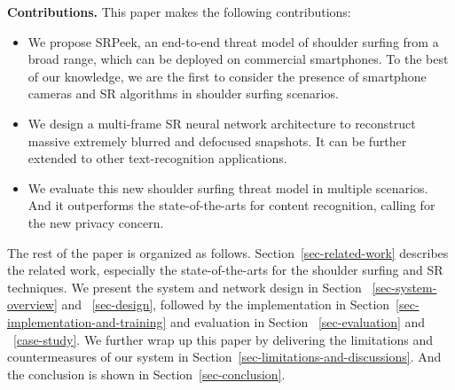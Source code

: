 \vspace{1mm}
\noindent
\textbf{Contributions.} This paper makes the following contributions:
\begin{itemize}[leftmargin=*]
  \item	We propose \textsf{SRPeek}, an end-to-end threat model of shoulder surfing from a broad range, which can be deployed on commercial smartphones. To the best of our knowledge, we are the first to consider the presence of smartphone cameras and SR algorithms in shoulder surfing scenarios.
  \item	We design a multi-frame SR neural network architecture to reconstruct massive extremely blurred and defocused snapshots. It can be further extended to other text-recognition applications.
  \item	We evaluate this new shoulder surfing threat model in multiple scenarios. And it outperforms the state-of-the-arts for content recognition, calling for the new privacy concern.
\end{itemize}

\vspace{1mm}
The rest of the paper is organized as follows. Section~\ref{sec-related-work} describes the related work, especially the state-of-the-arts for the shoulder surfing and SR techniques. We present the system and network design in Section ~\ref{sec-system-overview} and ~\ref{sec-design}, followed by the implementation in Section~\ref{sec-implementation-and-training} and evaluation in Section ~\ref{sec-evaluation} and ~\ref{case-study}. We further wrap up this paper by delivering the limitations and countermeasures of our system in Section~\ref{sec-limitations-and-discussions}. And the conclusion is shown in Section~\ref{sec-conclusion}.
